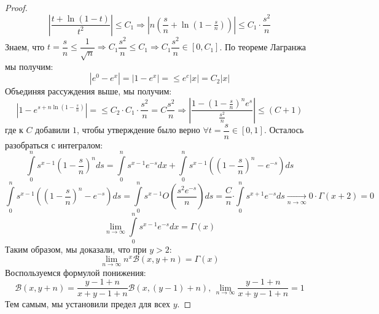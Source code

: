 \documentclass[12pt]{article}
\newcommand{\MB}{\mathcal{B}}
\theoremstyle{definition}
\newcommand{\ddint}[2]{\displaystyle\int\limits_{#1}^{#2}}
\begin{document}
\begin{proof}
	$$
		\left|\dfrac{t + \ln{(1 - t)}}{t^2}\right| \leq C_1 \Rightarrow \left|n\left(\dfrac{s}{n} + \ln{\left(1 - \tfrac{s}{n}\right)}\right)\right| \leq C_1{\cdot}\dfrac{s^2}{n}
	$$
	Знаем, что $t =\dfrac{s}{n} \leq \dfrac{1}{\sqrt{n}} \Rightarrow C_1\dfrac{s^2}{n} \leq  C_1 \Rightarrow C_1\dfrac{s^2}{n} \in [0,C_1]$. По теореме Лагранжа мы получим:
	$$
		\left|e^0 - e^x\right| = \left|1 - e^x\right|= \leq e^c|x| = C_2|x|
	$$
	Объединяя рассуждения выше, мы получим:
	$$
		\left|1 - e^{s + n\ln{\left(1 - \tfrac{s}{n}\right)}}\right| = \leq C_2{\cdot}C_1{\cdot}\dfrac{s^2}{n} = C\dfrac{s^2}{n} \Rightarrow \left|\dfrac{1 - \left(1 - \tfrac{s}{n}\right)^n e^s}{\tfrac{s^2}{n}} \right| \leq (C+1)
	$$
	где к $C$ добавили $1$, чтобы утверждение было верно $\forall t = \dfrac{s}{n} \in [0,1]$. Осталось разобраться с интегралом:
	$$
		\ddint{0}{n}s^{x-1}\left(1 - \dfrac{s}{n}\right)^nds = \ddint{0}{n}s^{x-1}e^{-s}dx + \ddint{0}{n}s^{x-1}\left( \left(1 - \dfrac{s}{n} \right)^n - e^{-s}\right)ds 
	$$
	$$
		 \ddint{0}{n}s^{x-1}\left( \left(1 - \dfrac{s}{n} \right)^n - e^{-s}\right)ds = \ddint{0}{n}s^{x-1}O\left(\dfrac{s^2e^{-s}}{n}\right)ds = \dfrac{C}{n}{\cdot\!}\ddint{0}{n}s^{x+1}e^{-s}ds \xrightarrow[n \to \infty]{} 0 {\cdot}\Gamma(x+2) = 0
	$$ 
	$$
		\lim\limits_{n \to \infty}\ddint{0}{n}s^{x-1}e^{-s}dx = \Gamma(x)
	$$
	Таким образом, мы доказали, что при $y > 2$:
	$$
		\lim\limits_{n \to \infty}n^x\MB(x,y + n) = \Gamma(x) 
	$$
	Воспользуемся формулой понижения:
	$$
		\MB(x,y + n) =  \dfrac{y -1 + n}{x + y -1 + n}\MB(x, (y-1) + n), \, \lim\limits_{n \to \infty}\dfrac{y -1 + n}{x + y -1 + n} = 1 
	$$
	Тем самым, мы установили предел для всех $y$.
\end{proof}
\newpage
\end{document}

